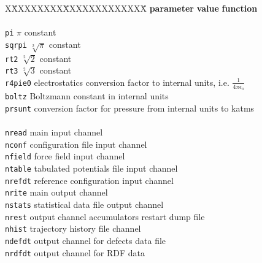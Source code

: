 \begin{tabbing}
X\=XXXXXXXX\=XXXXXXXXXXXXX\=\kill
\> {\bf parameter}   \> {\bf value}        \> {\bf function} \\
\>                   \>                    \> \\
\> {\tt pi}           \> $\pi$ constant \\
\> {\tt sqrpi}        \> $\sqrt[2]{\pi}$ constant \\
\> {\tt rt2}          \> $\sqrt[2]{2}$ constant \\
\> {\tt rt3}          \> $\sqrt[2]{3}$ constant \\
\> {\tt r4pie0}              \> electrostatics conversion factor to internal units, i.e. $\frac{1}{4 \pi \epsilon_{o}}$ \\
\> {\tt boltz}               \> Boltzmann constant in internal units \\
\> {\tt prsunt}              \> conversion factor for pressure from internal units to katms \\
\>                   \>                    \> \\
\> {\tt nread}                         \> main input channel \\
\> {\tt nconf}                        \> configuration file input channel \\
\> {\tt nfield}                       \> force field input channel \\
\> {\tt ntable}                       \> tabulated potentials file input channel \\
\> {\tt nrefdt}                       \> reference configuration input channel \\
\> {\tt nrite}                         \> main output channel \\
\> {\tt nstats}                       \> statistical data file output channel \\
\> {\tt nrest}                        \> output channel accumulators restart dump file \\
\> {\tt nhist}                        \> trajectory history file channel \\
\> {\tt ndefdt}                       \> output channel for defects data file \\
\> {\tt nrdfdt}                       \> output channel for RDF data \\

\end{tabbing}
